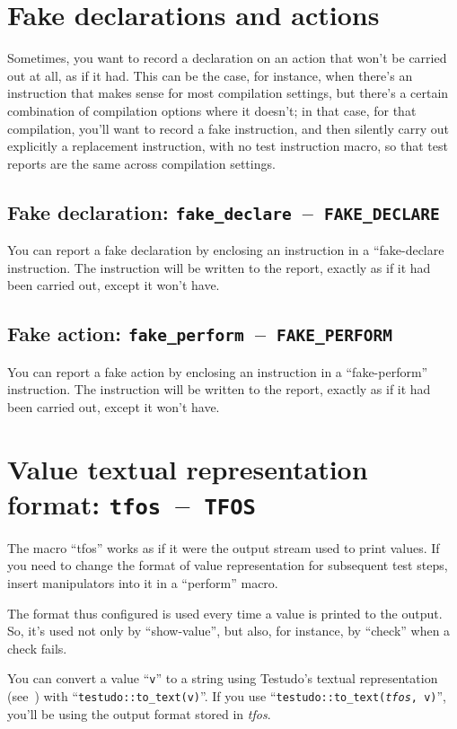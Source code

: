 \documentclass[twoside, a4paper, article]{memoir}
\newcommand*\testudocolor{\color{red!80!blue}}
\newcommand*\testudo[1]{\texttt{\testudocolor{}#1}}
\newcommand*\testudopair[2]{\testudo{#1}~--~\testudo{#2}}
\newcommand\sectiontestudopair[3]{%
  \section[#1]{#1: \testudopair{#2}{#3}}}
\newcommand\subsectiontestudopair[3]{%
  \subsection[#1]{#1: \testudopair{#2}{#3}}}
\providecommand\typesetexample[1]{%
}
\begin{document}
\section{Fake declarations and actions}
\label{sec:fake-declarations-actions}

Sometimes, you want to record a declaration on an action that won't be carried
out at all, as if it had.  This can be the case, for instance, when there's an
instruction that makes sense for most compilation settings, but there's a
certain combination of compilation options where it doesn't; in that case, for
that compilation, you'll want to record a fake instruction, and then silently
carry out explicitly a replacement instruction, with no test instruction macro,
so that test reports are the same across compilation settings.

\subsectiontestudopair{Fake declaration}{fake\_declare}{FAKE\_DECLARE}
\label{sec:fake-declaration}

You can report a fake declaration by enclosing an instruction in a
``fake-declare instruction.  The instruction will be written to the report,
exactly as if it had been carried out, except it won't have.

\typesetexample{fake-declare}


\subsectiontestudopair{Fake action}{fake\_perform}{FAKE\_PERFORM}
\label{sec:fake-action}

You can report a fake action by enclosing an instruction in a ``fake-perform''
instruction.  The instruction will be written to the report, exactly as if it
had been carried out, except it won't have.

\typesetexample{fake-perform}


\sectiontestudopair{Value textual representation format}%
  {tfos}{TFOS}
\label{sec:value-textual-representation-format}

The macro ``tfos'' works as if it were the output stream used to print values.
If you need to change the format of value representation for subsequent test
steps, insert manipulators into it in a ``perform'' macro.

\typesetexample{tfos}

The format thus configured is used every time a value is printed to the output.
So, it's used not only by ``show-value'', but also, for instance, by ``check''
when a check fails.

You can convert a value ``\texttt{v}'' to a string using Testudo's textual
representation (see~) with
``\texttt{testudo::to\_text(v)}''.  If you use
``\texttt{testudo::to\_text(\textit{tfos}, v)}'', you'll be using the output
format stored in \emph{tfos}.
\end{document}
